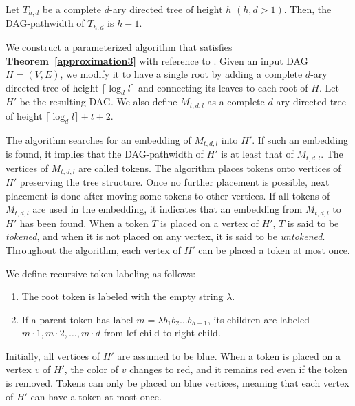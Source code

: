 \documentclass[runningheads]{llncs}
\theoremstyle{plain}
\theoremstyle{definition}
\begin{document}
\begin{lemma}\label{comp_tree}
    Let $T_{h, d}$ be a complete $d$-ary directed tree of height $h$ $(h, d > 1)$. Then, the DAG-pathwidth of $T_{h, d}$ is $h-1$.
\end{lemma}

We construct a parameterized algorithm that satisfies \textbf{Theorem~\ref{approximation3}} with reference to \cite{art8}. Given an input DAG $H = (V, E)$, we modify it to have a single root by adding a complete $d$-ary directed tree of height $\lceil \log_d l \rceil$ and connecting its leaves to each root of $H$. Let $H'$ be the resulting DAG. We also define $M_{t, d, l}$ as a complete $d$-ary directed tree of height $\lceil \log_d l \rceil +t+2$.

The algorithm searches for an embedding of $M_{t, d, l}$ into $H'$. If such an embedding is found, it implies that the DAG-pathwidth of $H'$ is at least that of $M_{t, d, l}$. The vertices of $M_{t, d, l}$ are called tokens. The algorithm places tokens onto vertices of $H'$ preserving the tree structure. Once no further placement is possible, next placement is done after moving some tokens to other vertices. If all tokens of $M_{t, d, l}$ are used in the embedding, it indicates that an embedding from $M_{t, d, l}$ to $H'$ has been found. When a token $T$ is placed on a vertex of $H'$, $T$ is said to be \textit{tokened}, and when it is not placed on any vertex, it is said to be \textit{untokened}. Throughout the algorithm, each vertex of $H'$ can be placed a token at most once.

We define recursive token labeling as follows:
\begin{enumerate}
    \item The root token is labeled with the empty string $\lambda$.
    \item If a parent token has label $m=\lambda b_1 b_2 \dots b_{h-1}$, its children are labeled $m \cdot 1, m \cdot 2, \dots, m \cdot d$ from lef child to right child.
\end{enumerate}

Initially, all vertices of $H'$ are assumed to be blue. When a token is placed on a vertex $v$ of $H'$, the color of $v$ changes to red, and it remains red even if the token is removed. Tokens can only be placed on blue vertices, meaning that each vertex of $H'$ can have a token at most once.



\end{document}
